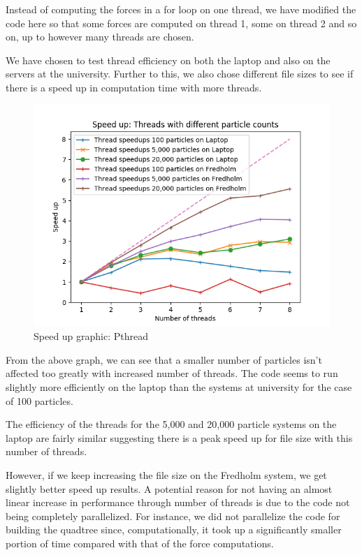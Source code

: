 \documentclass{article}
\begin{document}
Instead of computing the forces in a for loop on one thread, we have modified the code here so that some forces are computed on thread 1, some on thread 2 and so on, up to however many threads are chosen.\vspace{0.3cm}

We have chosen to test thread efficiency on both the laptop and also on the servers at the university. Further to this, we also chose different file sizes to see if there is a speed up in computation time with more threads.\vspace{0.3cm}

\begin{figure}[htb]
\begin{center}
\includegraphics[width = 12cm]{images/compute_pthreads.png}
\caption{Speed up graphic: Pthread}
\end{center}
\end{figure}
From the above graph, we can see that a smaller number of particles isn't affected too greatly with increased number of threads. The code seems to run slightly more efficiently on the laptop than the systems at university for the case of 100 particles.\vspace{0.3cm}

The efficiency of the threads for the 5,000 and 20,000 particle systems on the laptop are fairly similar suggesting there is a peak speed up for file size with this number of threads.\vspace{0.3cm}

However, if we keep increasing the file size on the Fredholm system, we get slightly better speed up results. A potential reason for not having an almost linear increase in performance through number of threads is due to the code not being completely parallelized. For instance, we did not parallelize the code for building the quadtree since, computationally, it took up a significantly smaller portion of time compared with that of the force computations.
\end{document}
